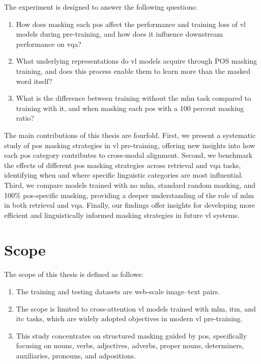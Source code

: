 The experiment is designed to answer the following questions:
\begin{enumerate}  
    \item How does masking each \acrshort{pos} affect the performance and training loss of \acrshort{vl} models during pre-training, and how does it influence downstream performance on \acrfull{vqa}?
    \item What underlying representations do \acrshort{vl} models acquire through \acrshort{POS} masking training, and does this process enable them to learn more than the masked word itself?
    \item What is the difference between training without the \acrshort{mlm} task compared to training with it, and when masking each \acrshort{pos} with a 100 percent masking ratio?
\end{enumerate}

The main contributions of this thesis are fourfold.
First, we present a systematic study of \acrshort{pos} masking strategies in \acrshort{vl} pre-training, offering new insights into how each \acrshort{pos} category contributes to cross-modal alignment.  
Second, we benchmark the effects of different \acrshort{pos} masking strategies across retrieval and \acrshort{vqa} tasks, identifying when and where specific linguistic categories are most influential.  
Third, we compare models trained with no \acrshort{mlm}, standard random masking, and 100\% \acrshort{pos}-specific masking, providing a deeper understanding of the role of \acrshort{mlm} in both retrieval and \acrshort{vqa}.  
Finally, our findings offer insights for developing more efficient and linguistically informed masking strategies in future \acrshort{vl} systems.  



\section{Scope}  
The scope of this thesis is defined as follows:  
\begin{enumerate}  
    \item The training and testing datasets are web-scale image–text pairs.  
    \item The scope is limited to cross-attention \acrshort{vl} models trained with \acrshort{mlm}, \acrshort{itm}, and \acrshort{itc} tasks, which are widely adopted objectives in modern \acrshort{vl} pre-training.
    \item This study concentrates on structured masking guided by \Acrshort{pos}, specifically focusing on nouns, verbs, adjectives, adverbs, proper nouns, determiners, auxiliaries, pronouns, and adpositions.
\end{enumerate}  